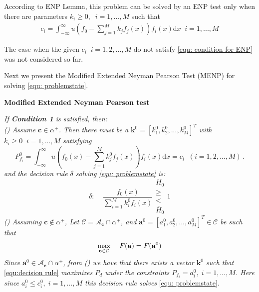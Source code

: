 \documentclass[12pt,journal,a4paper,twoside,onecolumn]{IEEEtran}
\newcommand{\rmnum}[1]{\romannumeral #1}
\begin{document}
\begin{spacing}{2.5}
According to ENP Lemma, this problem can be solved by an ENP test only when there are parameters $k_i \geq 0, \;\;i=1, ..., M$ such that 
\begin{equation}
\label{equ: condition for ENP}
\begin{split}
c_i = \int_{-\infty}^{\infty}u(f_0 - \sum_{j=1}^{M}k_jf_j(x))f_i(x)\mathrm{d}x \;\;i = 1, ..., M
\end{split}
\end{equation}

The case when the given $c_i\;\;i = 1, 2, ..., M$ do not satisfy \eqref{equ: condition for ENP} was not considered so far. 

Next we present the Modified Extended Neyman Pearson Test (MENP) for solving \eqref{equ: problemstate}.

\noindent \textbf{Modified Extended Neyman Pearson test}

\noindent \textit{
If \textnormal{\textbf{Condition 1}} is satisfied, then:
\\\textnormal{(\rmnum{1})} Assume $\mathbf{c} \in \alpha^+$. Then there must be a $\mathbf{k}^0 = [k_1^0, k_2^0, ..., k_M^0]^T$ with $k_i \geq 0\;\;i=1, ..., M$ satisfying
}
\begin{equation}
\label{equ:Pf}
  P_{f_i}^0 = \int_{-\infty}^{\infty} u(f_0(x) - \sum_{j=1}^{M}k_j^0f_j(x))f_i(x)\mathrm{d}x = c_i \;\; (i= 1, 2, ..., M)\,.
\end{equation}
\textit{
and the decision rule $\delta $ solving  \eqref{equ: problemstate} is:
}
\begin{equation}
\label{equ:decision rule}
\delta:\;\;\;\;\frac{f_0(x)}{\sum_{i=1}^{M}k_i^0f_i(x)} \substack{H_0 \\ \geq \\ < \\ \bar{H}_0} 1
\end{equation}
\textit{
\noindent \textnormal{(\rmnum{2})} Assuming $\mathbf{c} \notin \alpha^+$, Let $\mathcal{C} = \mathcal{A}_{\mathbf{c}} \cap \alpha^+$, and $\mathbf{a}^0 = [a_1^0, a_2^0, ..., a_M^0]^T \in \mathcal{C}$ be such that
}
\begin{equation}
\label{equ: F0}
\max_{\mathbf{a} \in \mathcal{C}}\;\;\;\;F(\mathbf{a}) = F(\mathbf{a}^0)\\
\end{equation}
\textit{
Since $\mathbf{a}^0 \in \mathcal{A}_{\mathbf{c}} \cap \alpha^+$, from \textnormal{(\rmnum{1})} we have that there exists a vector $\mathbf{k}^0$ such that}  \eqref{equ:decision rule} \textit{ maximizes $P_d$ under the constraints $P_{f_i} = a_i^0, \;i=1, ..., M$. Here since $a_i^0 \leq c_i^0, \;i=1, ..., M$ this decision rule  solves} \eqref{equ: problemstate}.


\end{spacing}
\end{document}
